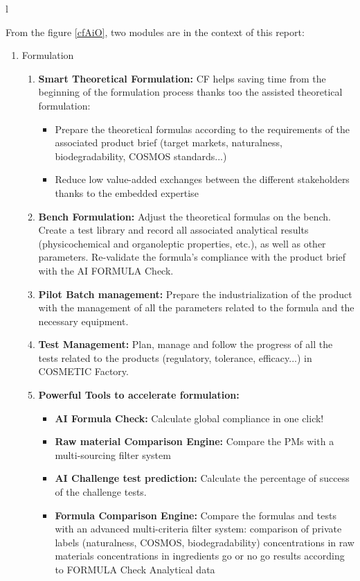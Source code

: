 l\documentclass[a4paper,12pt,twoside]{report}
\begin{document}
From the figure \ref{cfAiO}, two modules are in the context of this report:
\begin{enumerate}
\item Formulation
	\begin{enumerate}
	\item \textbf{Smart Theoretical Formulation:} CF helps saving time from the beginning of the formulation process thanks too the assisted theoretical formulation:
		\begin{itemize}
		\item Prepare the theoretical formulas according to the 
requirements of the associated product brief (target 
markets, naturalness, biodegradability, COSMOS standards...) 
		\item Reduce low value-added exchanges between the different 
stakeholders thanks to the embedded expertise
		\end{itemize}
	\item \textbf{Bench Formulation:} Adjust the theoretical formulas on the bench. Create a test 
library and record all associated analytical results (physicochemical 
and organoleptic properties, etc.), as well as other parameters. 
Re-validate the formula's compliance with the product brief with 
the AI FORMULA Check.
	\item \textbf{Pilot Batch management:} Prepare the industrialization of the product with the management 
of all the parameters related to the formula and the necessary 
equipment.
	\item \textbf{Test Management:} Plan, manage and follow the progress of all the tests related to the 
products (regulatory, tolerance, efficacy...) in COSMETIC Factory. 
	\item \textbf{Powerful Tools to accelerate formulation:}
	
	\begin{itemize}
		\item \textbf{AI Formula Check:} Calculate global compliance in one click!
		\item \textbf{Raw material Comparison Engine:}  Compare the PMs with 
a multi-sourcing filter system
		\item \textbf{AI Challenge test prediction:} Calculate the percentage of success of the challenge tests.
		\item \textbf{Formula Comparison Engine:} Compare the formulas and tests with an advanced multi-criteria filter system:
		\checkmark comparison of private labels (naturalness, COSMOS, biodegradability)
		\checkmark concentrations in raw materials
		\checkmark concentrations in ingredients
		\checkmark go or no go results according to FORMULA Check
		\checkmark Analytical data


\end{itemize}
\end{enumerate}
\end{enumerate}
\end{document}
